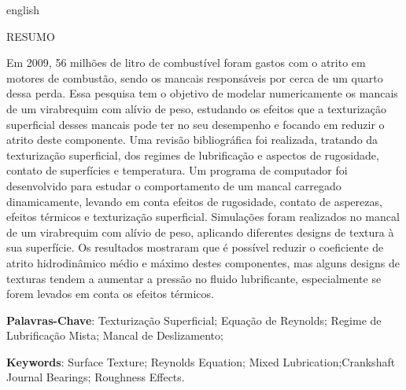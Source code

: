 \begin{otherlanguage*}{english}
	\begin{center}{\ABNTEXchapterfont\ABNTEXchapterfontsize RESUMO}\end{center}

Em 2009, 56 milhões de litro de combustível foram gastos com o atrito em motores de combustão, sendo os mancais responsáveis por cerca de um quarto dessa perda. Essa pesquisa tem o objetivo de modelar numericamente os mancais de um virabrequim com alívio de peso, estudando os efeitos que a texturização superficial desses mancais pode ter no seu desempenho e focando em reduzir o atrito deste componente. Uma revisão bibliográfica foi realizada, tratando da texturização superficial, dos regimes de lubrificação e aspectos de rugosidade, contato de superfícies e temperatura. Um programa de computador foi desenvolvido para estudar o comportamento de um mancal carregado dinamicamente, levando em conta efeitos de rugosidade, contato de asperezas, efeitos térmicos e texturização superficial. Simulações foram realizados no mancal de um virabrequim com alívio de peso, aplicando diferentes designs de textura à sua superfície. Os resultados mostraram que é possível reduzir o coeficiente de atrito hidrodinâmico médio e máximo destes componentes, mas alguns designs de texturas tendem a aumentar a pressão no fluido lubrificante, especialmente se forem levados em conta os efeitos térmicos.  

\noindent\textbf{Palavras-Chave}: Texturização Superficial; Equação de Reynolds; Regime de Lubrificação Mista; Mancal de Deslizamento; 

\end{otherlanguage*}

\newpage
\begin{resumo}
	

\vspace{\onelineskip}

\noindent\textbf{Keywords}: Surface Texture; Reynolds Equation; Mixed Lubrication;Crankshaft Journal Bearings; Roughness Effects.

\end{resumo}



\newpage

\renewcommand{\listfigurename}{List of Figures}
\renewcommand{\listtablename}{List of Tables}
\renewcommand{\contentsname}{Contents}
\renewcommand{\figurename}{Fig.}
\renewcommand\bibname{References}
\renewcommand\tablename{Table}

